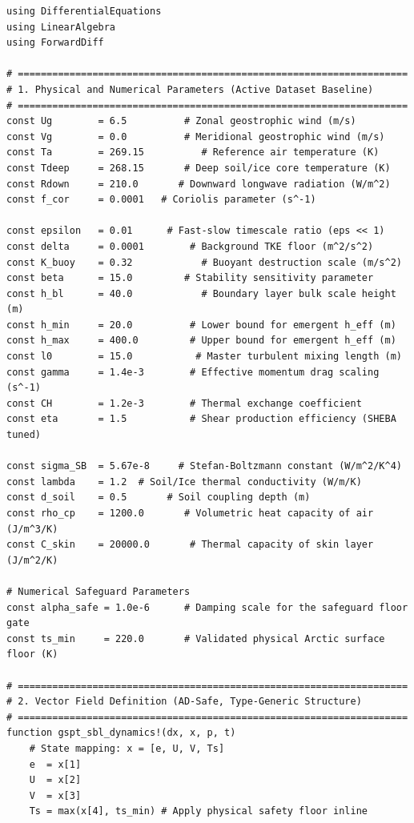\documentclass[11pt,letterpaper]{article}
\begin{document}
\begingroup
\footnotesize
\begin{verbatim}
using DifferentialEquations
using LinearAlgebra
using ForwardDiff

# ====================================================================
# 1. Physical and Numerical Parameters (Active Dataset Baseline)
# ====================================================================
const Ug        = 6.5          # Zonal geostrophic wind (m/s)
const Vg        = 0.0          # Meridional geostrophic wind (m/s)
const Ta        = 269.15          # Reference air temperature (K)
const Tdeep     = 268.15       # Deep soil/ice core temperature (K)
const Rdown     = 210.0       # Downward longwave radiation (W/m^2)
const f_cor     = 0.0001   # Coriolis parameter (s^-1)

const epsilon   = 0.01      # Fast-slow timescale ratio (eps << 1)
const delta     = 0.0001        # Background TKE floor (m^2/s^2)
const K_buoy    = 0.32            # Buoyant destruction scale (m/s^2)
const beta      = 15.0         # Stability sensitivity parameter
const h_bl      = 40.0            # Boundary layer bulk scale height (m)
const h_min     = 20.0          # Lower bound for emergent h_eff (m)
const h_max     = 400.0         # Upper bound for emergent h_eff (m)
const l0        = 15.0           # Master turbulent mixing length (m)
const gamma     = 1.4e-3        # Effective momentum drag scaling (s^-1)
const CH        = 1.2e-3        # Thermal exchange coefficient
const eta       = 1.5           # Shear production efficiency (SHEBA tuned)

const sigma_SB  = 5.67e-8     # Stefan-Boltzmann constant (W/m^2/K^4)
const lambda    = 1.2  # Soil/Ice thermal conductivity (W/m/K)
const d_soil    = 0.5       # Soil coupling depth (m)
const rho_cp    = 1200.0       # Volumetric heat capacity of air (J/m^3/K)
const C_skin    = 20000.0       # Thermal capacity of skin layer (J/m^2/K)

# Numerical Safeguard Parameters
const alpha_safe = 1.0e-6      # Damping scale for the safeguard floor gate
const ts_min     = 220.0       # Validated physical Arctic surface floor (K)

# ====================================================================
# 2. Vector Field Definition (AD-Safe, Type-Generic Structure)
# ====================================================================
function gspt_sbl_dynamics!(dx, x, p, t)
    # State mapping: x = [e, U, V, Ts]
    e  = x[1]
    U  = x[2]
    V  = x[3]
    Ts = max(x[4], ts_min) # Apply physical safety floor inline


\end{verbatim}
\end{document}
